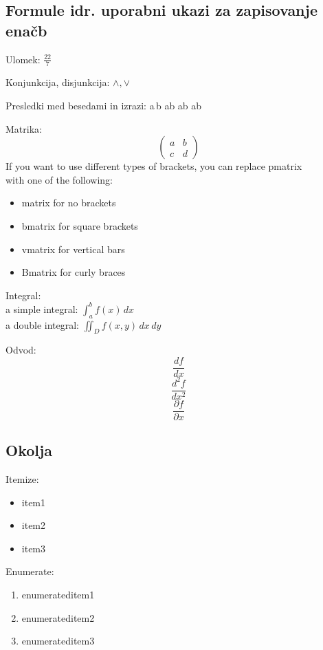 \documentclass[a4paper]{article}
\begin{document}
\subsection{Formule idr. uporabni ukazi za zapisovanje enačb}
\begin{raggedright}
Ulomek: 
$\frac{22}{7}$ \\
\end{raggedright}

Konjunkcija, disjunkcija: 
$\wedge, \vee$

Presledki med besedami in izrazi:
a\,b 
a\;b 
a\quad b
a\qquad b



Matrika:
\[
\begin{pmatrix}
a & b \\
c & d
\end{pmatrix}
\]
%
%
If you want to use different types of brackets, you can replace pmatrix \\
with one of the following:
\begin{itemize}
    \item matrix for no brackets
    \item bmatrix for square brackets
    \item vmatrix for vertical bars
    \item Bmatrix for curly braces
\end{itemize} 
%
Integral: \\
a simple integral: $\int_a^b f(x) \, dx$ \\
a double integral: $ \iint_D f(x, y) \, dx \, dy$
%

\noindent Odvod: 
\[ \frac{df}{dx} \] 
\[ \frac{d^2f}{dx^2} \] 
\[ \frac{\partial f}{\partial x} \]


\subsection{Okolja}
Itemize:
\begin{itemize}
    \item item1
    \item item2
    \item item3
\end{itemize}
Enumerate:
\begin{enumerate}
    \item enumerateditem1
    \item enumerateditem2
    \item enumerateditem3
\end{enumerate}
\end{document}
